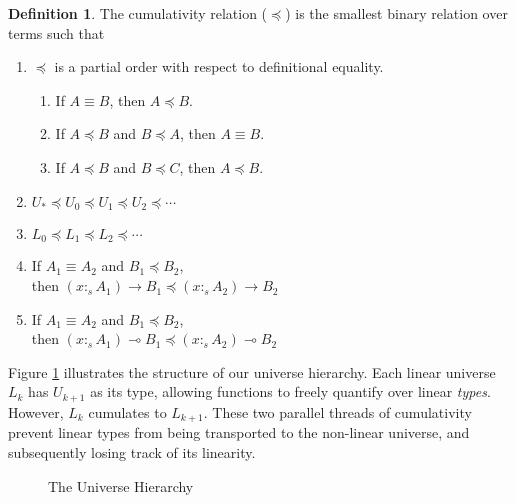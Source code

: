 \documentclass[sigplan,screen,review,authordraft]{acmart}
\theoremstyle{definition}
\newtheorem{definition}{Definition}[section]
\newcommand{\stype}[1]{:_#1}
\begin{document}
  \begin{definition}
    The cumulativity relation ($\preceq$) is the smallest binary relation over terms such that
    \begin{enumerate}
      \item $\preceq$ is a partial order with respect to definitional equality.
        \begin{enumerate}
          \item If $A \equiv B$, then $A \preceq B$.
          \item If $A \preceq B$ and $B \preceq A$, then $A \equiv B$.
          \item If $A \preceq B$ and $B \preceq C$, then $A \preceq B$.
        \end{enumerate}
      \item $U_* \preceq U_0 \preceq U_1 \preceq U_2 \preceq \cdots$
      \item $L_0 \preceq L_1 \preceq L_2 \preceq \cdots$
      \item If $A_1 \equiv A_2$ and $B_1 \preceq B_2$, \\ then
        $(x \stype{s} A_1) \rightarrow B_1 \preceq (x \stype{s} A_2) \rightarrow B_2$
      \item If $A_1 \equiv A_2$ and $B_1 \preceq B_2$, \\ then
        $(x \stype{s} A_1) \multimap B_1 \preceq (x \stype{s} A_2) \multimap B_2$
    \end{enumerate}
  \end{definition}

  Figure \ref{universe} illustrates the structure of our universe hierarchy. Each linear universe $L_k$ has $U_{k+1}$ as its type, allowing functions to freely quantify over linear \textit{types}. However, $L_k$ cumulates to $L_{k+1}$. These two parallel threads of cumulativity prevent linear types from being transported to the non-linear universe, and subsequently losing track of its linearity.

  \begin{figure}[H]
    \vspace{-1.6em}
    \caption{The Universe Hierarchy}
    \vspace{0.8em}
    \centering
    \vspace{-1em}
    \label{universe}
  \end{figure}
\end{document}
